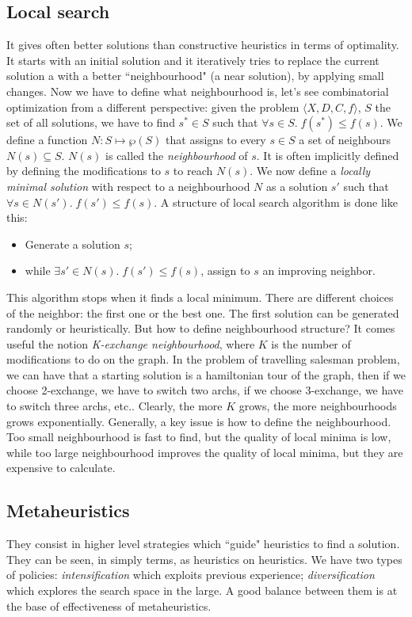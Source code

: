 \documentclass[10pt,a4paper]{article}
\begin{document}
\subsection{Local search}
It gives often better solutions than constructive heuristics in terms of
optimality. It starts with an initial solution and it iteratively tries to
replace the current solution a with a better ``neighbourhood" (a near solution),
by applying small changes. Now we have to define what neighbourhood is, let's
see combinatorial optimization from a different perspective: given the problem
$\langle X, D, C, f \rangle$, $S$ the set of all solutions, we have to find
$s^* \in S$ such that $\forall s \in S. \; f(s^*) \leq f(s)$. We define a
function $N: S \mapsto \wp(S)$ that assigns to every $s \in S$ a set of
neighbours $N(s) \subseteq S$. $N(s)$ is called the \textit{neighbourhood} of
$s$. It is often implicitly defined by defining the modifications to $s$ to
reach $N(s)$. We now define a \textit{locally minimal solution} with respect to
a neighbourhood $N$ as a solution $s'$ such that
$\forall s \in N(s'). \; f(s') \leq f(s)$. A structure of local search algorithm
is done like this:
\begin{itemize}
    \item Generate a solution $s$;
    \item while $\exists s' \in N(s). \; f(s') \leq f(s)$, assign to $s$ an
    improving neighbor.
\end{itemize}
This algorithm stops when it finds a local minimum. There are different choices
of the neighbor: the first one or the best one. The first solution can be
generated randomly or heuristically. But how to define neighbourhood structure?
It comes useful the notion \textit{K-exchange neighbourhood}, where $K$ is the
number of modifications to do on the graph. In the problem of travelling
salesman problem, we can have that a starting solution is a hamiltonian tour
of the graph, then if we choose 2-exchange, we have to switch two archs, if
we choose 3-exchange, we have to switch three archs, etc.. Clearly, the more $K$
grows, the more neighbourhoods grows exponentially. Generally, a key issue is
how to define the neighbourhood. Too small neighbourhood is fast to find, but
the quality of local minima is low, while too large neighbourhood improves the
quality of local minima, but they are expensive to calculate.

\subsection{Metaheuristics}
They consist in higher level strategies which ``guide" heuristics to find a
solution. They can be seen, in simply terms, as heuristics on heuristics. We
have two types of policies: \textit{intensification} which exploits previous
experience; \textit{diversification} which explores the search space in the
large. A good balance between them is at the base of effectiveness of
metaheuristics.
\end{document}
